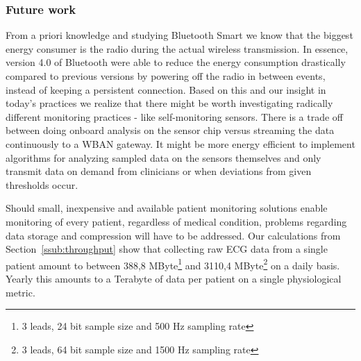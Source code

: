 
\subsubsection{Future work} %
\label{ssub:future_work}

From a priori knowledge and studying Bluetooth Smart we know that the biggest energy consumer is the radio during the actual wireless transmission. In essence, version 4.0 of Bluetooth were able to reduce the energy consumption drastically compared to previous versions by powering off the radio in between events, instead of keeping a persistent connection. Based on this and our insight in today's practices we realize that there might be worth investigating radically different monitoring practices - like self-monitoring sensors. There is a trade off between doing onboard analysis on the sensor chip versus streaming the data continuously to a WBAN gateway. It might be more energy efficient to implement algorithms for analyzing sampled data on the sensors themselves and only transmit data on demand from clinicians or when deviations from given thresholds occur.

Should small, inexpensive and available patient monitoring solutions enable monitoring of every patient, regardless of medical condition, problems regarding data storage and compression will have to be addressed. Our calculations from Section~\ref{ssub:throughput} show that collecting raw ECG data from a single patient amount to between 388,8 MByte\footnote{3 leads, 24 bit sample size and 500 Hz sampling rate} and 3110,4 MByte\footnote{3 leads, 64 bit sample size and 1500 Hz sampling rate} on a daily basis. Yearly this amounts to a Terabyte of data per patient on a single physiological metric.


